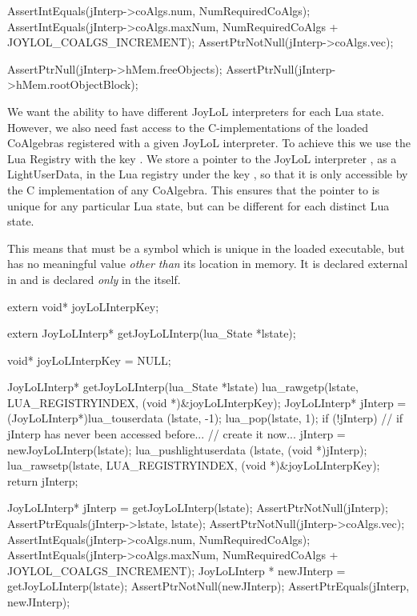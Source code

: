   AssertIntEquals(jInterp->coAlgs.num,
    NumRequiredCoAlgs);
  AssertIntEquals(jInterp->coAlgs.maxNum,
    NumRequiredCoAlgs + JOYLOL_COALGS_INCREMENT);
  AssertPtrNotNull(jInterp->coAlgs.vec);
  
  AssertPtrNull(jInterp->hMem.freeObjects);
  AssertPtrNull(jInterp->hMem.rootObjectBlock);
\stopCTest
\stopTestCase
\stopTestSuite


We want the ability to have different JoyLoL interpreters for each Lua 
state. However, we also need fast access to the C-implementations of the 
loaded CoAlgebras registered with a given JoyLoL interpreter. To achieve 
this we use the Lua Registry with the  key 
. We store a pointer to the JoyLoL interpreter 
, as a LightUserData, in the Lua registry under the key 
, so that it is only accessible by the C 
implementation of any CoAlgebra. This ensures that the pointer to 
 is unique for any particular Lua state, but can be 
different for each distinct Lua state. 

This means that  must be a symbol which is unique in 
the loaded executable, but has no meaningful value \emph{other than} its 
location in memory. It is declared external in  and is 
declared \emph{only} in the  itself. 

\startCHeader
extern void* joyLoLInterpKey;

extern JoyLoLInterp* getJoyLoLInterp(lua_State *lstate);
\stopCHeader

\startCCode
void* joyLoLInterpKey = NULL;

JoyLoLInterp* getJoyLoLInterp(lua_State *lstate) {
  lua_rawgetp(lstate, LUA_REGISTRYINDEX, (void *)&joyLoLInterpKey);
  JoyLoLInterp* jInterp = (JoyLoLInterp*)lua_touserdata (lstate, -1);
  lua_pop(lstate, 1);
  if (!jInterp) {
    // if jInterp has never been accessed before... 
    // create it now...
    jInterp = newJoyLoLInterp(lstate);
    lua_pushlightuserdata (lstate, (void *)jInterp);
    lua_rawsetp(lstate, LUA_REGISTRYINDEX, (void *)&joyLoLInterpKey);
  }
  return jInterp;
}
\stopCCode


\startCTest
  JoyLoLInterp* jInterp = getJoyLoLInterp(lstate);
  AssertPtrNotNull(jInterp);
  AssertPtrEquals(jInterp->lstate, lstate);
  AssertPtrNotNull(jInterp->coAlgs.vec);
  AssertIntEquals(jInterp->coAlgs.num, NumRequiredCoAlgs);
  AssertIntEquals(jInterp->coAlgs.maxNum,
    NumRequiredCoAlgs + JOYLOL_COALGS_INCREMENT);
  JoyLoLInterp * newJInterp = getJoyLoLInterp(lstate);
  AssertPtrNotNull(newJInterp);
  AssertPtrEquals(jInterp, newJInterp);
\stopCTest
\stopTestCase
\stopTestSuite

